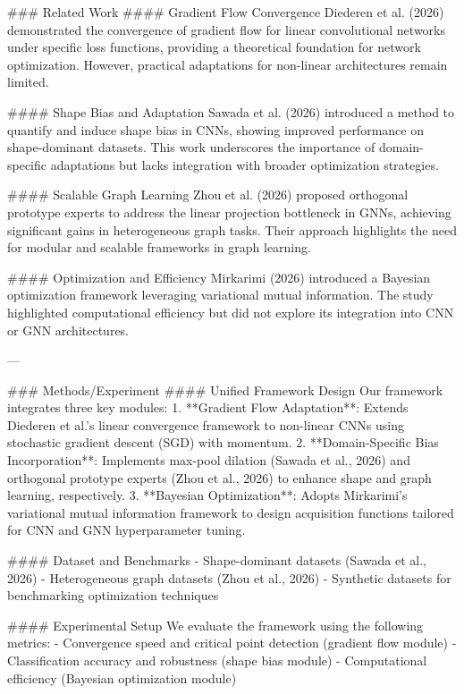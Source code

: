### Related Work  
#### Gradient Flow Convergence  
Diederen et al. (2026) demonstrated the convergence of gradient flow for linear convolutional networks under specific loss functions, providing a theoretical foundation for network optimization. However, practical adaptations for non-linear architectures remain limited.

#### Shape Bias and Adaptation  
Sawada et al. (2026) introduced a method to quantify and induce shape bias in CNNs, showing improved performance on shape-dominant datasets. This work underscores the importance of domain-specific adaptations but lacks integration with broader optimization strategies.

#### Scalable Graph Learning  
Zhou et al. (2026) proposed orthogonal prototype experts to address the linear projection bottleneck in GNNs, achieving significant gains in heterogeneous graph tasks. Their approach highlights the need for modular and scalable frameworks in graph learning.

#### Optimization and Efficiency  
Mirkarimi (2026) introduced a Bayesian optimization framework leveraging variational mutual information. The study highlighted computational efficiency but did not explore its integration into CNN or GNN architectures.

---

### Methods/Experiment  
#### Unified Framework Design  
Our framework integrates three key modules:  
1. **Gradient Flow Adaptation**: Extends Diederen et al.'s linear convergence framework to non-linear CNNs using stochastic gradient descent (SGD) with momentum.  
2. **Domain-Specific Bias Incorporation**: Implements max-pool dilation (Sawada et al., 2026) and orthogonal prototype experts (Zhou et al., 2026) to enhance shape and graph learning, respectively.  
3. **Bayesian Optimization**: Adopts Mirkarimi's variational mutual information framework to design acquisition functions tailored for CNN and GNN hyperparameter tuning.

#### Dataset and Benchmarks  
- Shape-dominant datasets (Sawada et al., 2026)  
- Heterogeneous graph datasets (Zhou et al., 2026)  
- Synthetic datasets for benchmarking optimization techniques  

#### Experimental Setup  
We evaluate the framework using the following metrics:  
- Convergence speed and critical point detection (gradient flow module)  
- Classification accuracy and robustness (shape bias module)  
- Computational efficiency (Bayesian optimization module)

